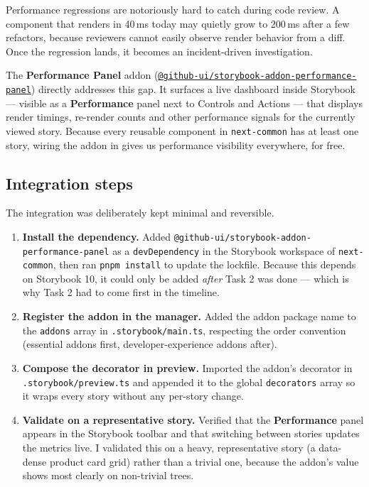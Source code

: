 Performance regressions are notoriously hard to catch during code review. A component that renders in 40\,ms today may quietly grow to 200\,ms after a few refactors, because reviewers cannot easily observe render behavior from a diff. Once the regression lands, it becomes an incident-driven investigation.

The \textbf{Performance Panel} addon (\href{\allowbreak https://github.com/github/storybook-addon-performance-panel}{\texttt{@github-ui/storybook-addon-performance-panel}}) directly addresses this gap. It surfaces a live dashboard inside Storybook --- visible as a \textbf{Performance} panel next to Controls and Actions --- that displays render timings, re-render counts and other performance signals for the currently viewed story. Because every reusable component in \texttt{next-common} has at least one story, wiring the addon in gives us performance visibility everywhere, for free.

\subsection{Integration steps}

The integration was deliberately kept minimal and reversible.

\begin{enumerate}
    \item \textbf{Install the dependency.} Added \texttt{\allowbreak @github-ui/storybook-addon-performance-panel} as a \texttt{devDependency} in the Storybook workspace of \texttt{next-common}, then ran \texttt{pnpm install} to update the lockfile. Because this depends on Storybook 10, it could only be added \emph{after} Task 2 was done --- which is why Task 2 had to come first in the timeline.
    \item \textbf{Register the addon in the manager.} Added the addon package name to the \texttt{addons} array in \texttt{.storybook/main.ts}, respecting the order convention (essential addons first, developer-experience addons after).
    \item \textbf{Compose the decorator in preview.} Imported the addon's decorator in \texttt{.storybook/preview.ts} and appended it to the global \texttt{decorators} array so it wraps every story without any per-story change.
    \item \textbf{Validate on a representative story.} Verified that the \textbf{Performance} panel appears in the Storybook toolbar and that switching between stories updates the metrics live. I validated this on a heavy, representative story (a data-dense product card grid) rather than a trivial one, because the addon's value shows most clearly on non-trivial trees.
\end{enumerate}

